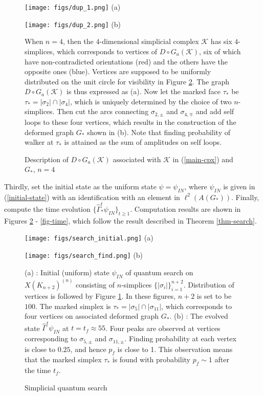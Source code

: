 \documentclass[a4paper,12pt]{article}
\numberwithin{equation}{section}
\begin{document}
\begin{figure}[htbp]\em
\begin{minipage}{0.5\hsize}
\centering
\texttt{[image: figs/dup\_1.png]}
(a)
\end{minipage}
\begin{minipage}{0.5\hsize}
\centering
\texttt{[image: figs/dup\_2.png]}
(b)
\end{minipage}
\caption{Description of $D\circ G_a(\mathcal{K})$ associated with $\mathcal{K}$ in (\ref{main-cpx}) and $G_\ast$, $n=4$}
\label{fig-dup-num}
When $n=4$, then the $4$-dimensional simplicial complex $\mathcal{K}$ has six $4$-simplices, which corresponds to vertices of $D\circ G_a(\mathcal{K})$, six of which have non-contradicted orientations (red) and the others have the opposite ones (blue). 
Vertices are supposed to be uniformly distributed on the unit circle for visibility in Figure \ref{fig-search}.
The graph $D\circ G_a(\mathcal{K})$ is thus expressed as (a).
Now let the marked face $\tau_\ast$ be $\tau_\ast = |\sigma_2|\cap |\sigma_4|$, which is uniquely determined by the choice of two $n$-simplices.
Then cut the arcs connecting $\sigma_{2,\pm}$ and $\sigma_{4,\mp}$ and add self loops to these four vertices, which results in the construction of the deformed graph $G_\ast$ shown in (b).
Note that finding probability of walker at $\tau_\ast$ is attained as the sum of amplitudes on self loops.
\end{figure}

\par
Thirdly, set the initial state as the uniform state $\psi = \psi_{IN}$, where $\psi_{IN}$ is given in (\ref{initial-state}) with an identification with an element in $\ell^2(A(G_\ast))$.
Finally, compute the time evolution $\{\hat \Gamma^t_\ast \psi_{IN}\}_{t\geq 1}$.
Computation results are shown in Figures \ref{fig-search} - \ref{fig-time}, which follow the result described in Theorem \ref{thm-search}.

\begin{figure}[htbp]\em
\begin{minipage}{0.5\hsize}
\centering
\texttt{[image: figs/search\_initial.png]}
(a)
\end{minipage}
\begin{minipage}{0.5\hsize}
\centering
\texttt{[image: figs/search\_find.png]}
(b)
\end{minipage}
\caption{Simplicial quantum search}
\label{fig-search}
(a) : Initial (uniform) state $\psi_{IN}$ of quantum search on $X(K_{n+2})^{(n)}$ consisting of $n$-simplices $\{|\sigma_i|\}_{i=1}^{n+2}$. 
Distribution of vertices is followed by Figure \ref{fig-dup-num}.
In these figures, $n+2$ is set to be $100$.
The marked simplex is $\tau_\ast = |\sigma_5|\cap |\sigma_{11}|$, which corresponds to four vertices on associated deformed graph $G_\ast$.
(b) : The evolved state $\hat \Gamma^t \psi_{IN}$ at $t = t_f \approx 55$.
Four peaks are observed at vertices corresponding to $\sigma_{5,\pm}$ and $\sigma_{11,\pm}$.
Finding probability at each vertex is close to $0.25$, and hence $p_f$ is close to 1.
This observation means that the marked simplex $\tau_\ast$ is found with probability $p_f\sim 1$ after the time $t_f$.
\end{figure}
\end{document}
